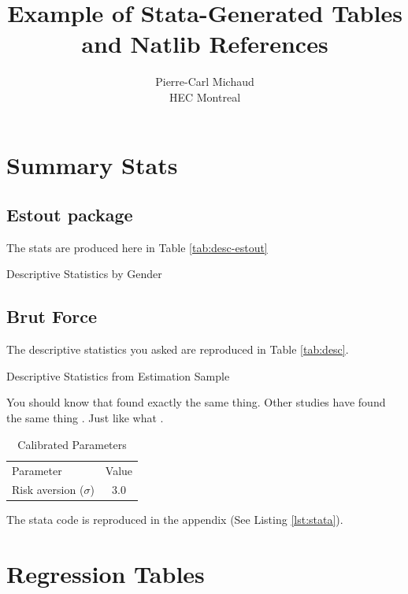 \documentclass[11pt, oneside]{article}   	%
\title{Example of Stata-Generated Tables and Natlib References}
\author{Pierre-Carl Michaud \\ HEC Montreal}
\begin{document}
\maketitle

\section{Summary Stats}

\subsection{Estout package}

The stats are produced here in Table \ref{tab:desc-estout}

\begin{table}[htp]
  \centering
  
  \caption{Descriptive Statistics by Gender}
  \label{tab:desc-estout}
\end{table}

\subsection{Brut Force}
The descriptive statistics you asked are reproduced in Table \ref{tab:desc}. 

\begin{table}[htp]
\centering

\caption{Descriptive Statistics from Estimation Sample}
\label{tab:desc}
\end{table}

You should know that \citep{lusardi_financial_2007} found exactly the same thing. Other studies have found the same thing \citet{Lusardi2017OptimalInequality}. Just like what \citet{Card1990TheMarket}.

\begin{table}[!htp]
\centering
\begin{tabular}{lc}
\hline\hline
 Parameter   & Value  \\
Risk aversion ($\sigma$)     & 3.0 \\
\hline\hline
\end{tabular}
\caption{Calibrated Parameters}
\end{table}


The stata code is reproduced in the appendix (See Listing \ref{lst:stata}). 

\section{Regression Tables}
\end{document}
